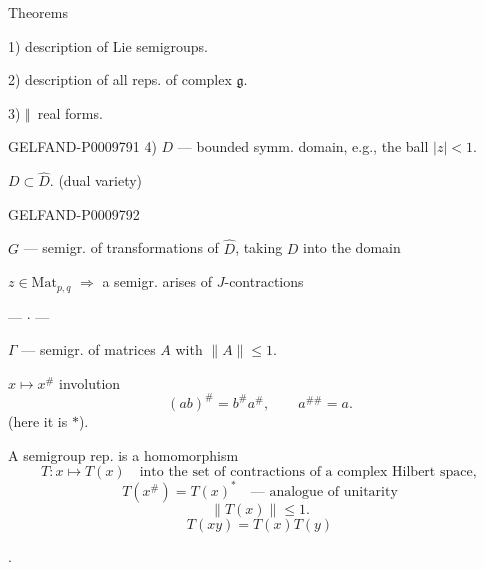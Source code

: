 Theorems

1) description of Lie semigroups.

2) description of all reps. of complex $\mathfrak g$.

3) \textemdash\(\Vert\)\textemdash\ real forms.

\begin{GelfandAdjacentEvidence}{GELFAND-P000979}{1}
4) $D$ --- bounded symm. domain, e.g., the ball $|z|<1$.

$D\subset\widehat D$. (dual variety)
\end{GelfandAdjacentEvidence}
\begin{GelfandAdjacentEvidence}{GELFAND-P000979}{2}


$G$ --- semigr. of transformations of $\widehat D$, taking $D$ into the domain

$z\in\mathrm{Mat}_{p,q}$ $\Rightarrow$ a semigr. arises of $J$-contractions

\begin{center}--- \(\cdot\) ---\end{center}

$\Gamma$ --- semigr. of matrices $A$ with $\|A\|\leqslant1$.

$x\mapsto x^\#$ involution
\[
 (ab)^\#=b^\#a^\#,\qquad a^{\#\#}=a.
\]
(here it is $*$).

A semigroup rep. is a homomorphism
\[
 T\colon x\mapsto T(x)\quad\text{into the set of contractions of a complex Hilbert space},
\]
\[
 T(x^\#)=T(x)^*\quad\text{--- analogue of unitarity}
\]
\[
 \|T(x)\|\leqslant1.
\]
\[
 T(xy)=T(x)T(y)
\]

.
\end{GelfandAdjacentEvidence}
